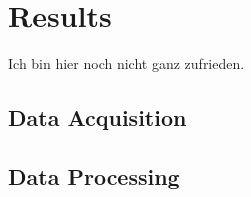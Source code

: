 \chapter{Results}
Ich bin hier noch nicht ganz zufrieden.
	\section{Data Acquisition}
	\section{Data Processing}
